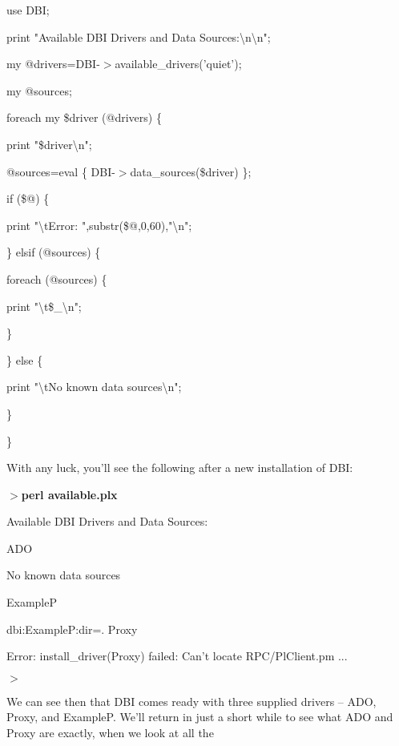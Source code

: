 \documentclass[a4paper,11pt]{book}
\begin{document}
\noindent use DBI;

\noindent 

\noindent 

\noindent print "Available DBI Drivers and Data Sources:\textbackslash n\textbackslash n";

\noindent my @drivers=DBI-$>$available\_drivers('quiet');

\noindent my @sources;

\noindent 

\noindent foreach my \$driver (@drivers) \{

\noindent print "\$driver\textbackslash n";

\noindent @sources=eval \{ DBI-$>$data\_sources(\$driver) \};

\noindent if (\$@) \{

\noindent print "\textbackslash tError: ",substr(\$@,0,60),"\textbackslash n";

\noindent \} elsif (@sources) \{

\noindent foreach (@sources) \{

\noindent print "\textbackslash t\$\_\textbackslash n";

\noindent \}

\noindent \} else \{

\noindent print "\textbackslash tNo known data sources\textbackslash n";

\noindent \}

\noindent \}

\noindent 

\noindent With any luck, you'll see the following after a new installation of DBI:

\noindent 

\noindent $>$\textbf{perl available.plx}

\noindent Available DBI Drivers and Data Sources:

\noindent 

\noindent ADO

\noindent 

\noindent No known data sources

\noindent ExampleP

dbi:ExampleP:dir=. Proxy

\noindent Error: install\_driver(Proxy) failed: Can't locate RPC/PlClient.pm ...

\noindent $>$

\noindent 

\noindent We can see then that DBI comes ready with three supplied drivers -- ADO, Proxy, and ExampleP. We'll return in just a short while to see what ADO and Proxy are exactly, when we look at all the
\end{document}
